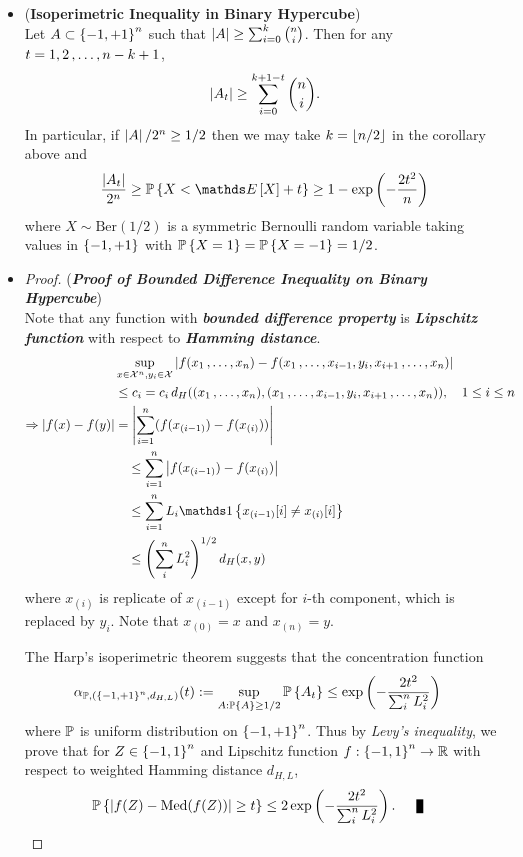 \documentclass[11pt]{article}
\begin{document}
\begin{itemize}
\item \begin{corollary} (\textbf{Isoperimetric Inequality in Binary Hypercube}) \citep{boucheron2013concentration}\\ 
Let $A \subset \left\{-1, +1\right\}^n$ such that $\left\lvert A \right\rvert \ge \sum_{i=0}^{k}{n \choose i}$. Then for any $t=1, 2 \,{,}\ldots{,}\, n-k+1$, 
\begin{align}
\left\lvert A_t \right\rvert \ge  \sum_{i=0}^{k+1 - t}{n \choose i}. \label{ineqn: harp_vertex_isoperimetric_inequality}
\end{align} In particular, if $\left\lvert A \right\rvert/2^n \ge 1/2$ then we may take $k = \left\lfloor n/2 \right\rfloor$ in the corollary above and
\begin{align}
\frac{\abs{A_t}}{2^n} \ge \bP\set{X  < \E{}{X} + t } \ge 1 - \exp\paren{- \frac{2t^2}{n}}
\end{align} where $X \sim \text{Ber}(1/2)$ is a symmetric Bernoulli random variable taking values in $\left\{-1, +1\right\}$ with ${\mathbb P}\left\{X= 1\right\} = {\mathbb P}\left\{X = -1\right\} = 1/2$.
\end{corollary}

\item \begin{proof} (\textbf{\emph{Proof of Bounded Difference Inequality on Binary Hypercube}}) \\
Note that any  function with \emph{\textbf{bounded difference property}} is \emph{\textbf{Lipschitz function}} with respect to \emph{\textbf{Hamming distance}}. 
\begin{align*}
&\sup_{x \in \cX^n, y_i \in \cX}\abs{f(x_1 \xdotx{,} x_n) - f(x_1 \xdotx{,} x_{i-1}, y_i, x_{i+1} \xdotx{,} x_{n})} &\\
&\le c_i = c_i\,d_{H}((x_1 \xdotx{,} x_n), (x_1 \xdotx{,} x_{i-1}, y_i, x_{i+1} \xdotx{,} x_{n})), \quad 1\le i \le n\\
\Rightarrow \abs{f(x) - f(y)} &=  \abs{\sum_{i=1}^{n}(f(x_{(i-1)}) - f(x_{(i)}) )}\\
&\quad \le  \sum_{i=1}^{n}\abs{f(x_{(i-1)}) - f(x_{(i)}) }\\
&\quad \le \sum_{i=1}^{n}L_i \ind{x_{(i-1)}[i] \neq x_{(i)}[i]} \\
&\quad \le \paren{\sum_i^{n}L_i^2}^{1/2} d_{H}(x, y)
\end{align*}   where $x_{(i)}$ is replicate of $x_{(i-1)}$ except for $i$-th component, which is replaced by $y_i$. Note that $x_{(0)} = x$ and $x_{(n)} = y$. 

The Harp's isoperimetric theorem suggests that the concentration function 
\begin{align*}
\alpha_{{\mathbb P}, (\left\{-1, +1\right\}^n, d_{H, L})}(t) := \sup_{A: {\mathbb P}\left\{A\right\} \ge 1/2}{\mathbb P}\left\{A_t\right\} &\le \exp\left(- \frac{2t^2}{\sum_i^{n}L_i^2}\right)
\end{align*} where ${\mathbb P}$ is uniform distribution on $\left\{-1, +1\right\}^n$. Thus by \emph{Levy's inequality}, we prove that for $Z \in \left\{-1, 1\right\}^n$ and Lipschitz function $f: \left\{-1, 1\right\}^n \to {\mathbb R}$ with respect to weighted Hamming distance $d_{H, L}$, 
\begin{align*}
\bP\set{\abs{f(Z) - \text{Med}(f(Z))} \ge t} &\le 2 \exp\paren{- \frac{2t^2}{\sum_i^{n}L_i^2}}. \qed
\end{align*} 
\end{proof}
\end{itemize}
\end{document}
